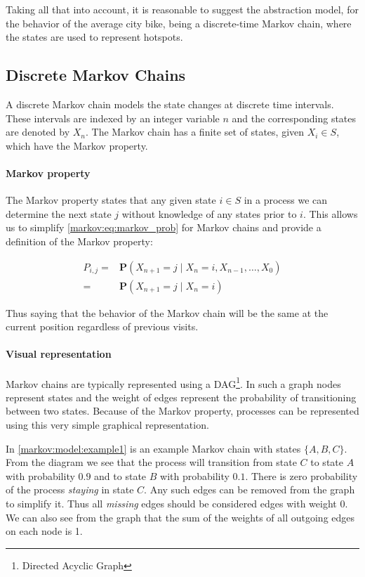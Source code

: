Taking all that into account, it is reasonable to suggest the abstraction model, for the behavior of the average city bike, being a discrete-time Markov chain, where the states are used to represent hotspots.

\subsection{Discrete Markov Chains}\label{markov}
A discrete Markov chain models the state changes at discrete time intervals.
These intervals are indexed by an integer variable $ n $ and the corresponding states are denoted by $ X_n $.
The Markov chain has a finite set of states, given $X_i \in S$, which have the Markov property.

\paragraph{Markov property}\label{markov:property}
The Markov property states that any given state $i \in S$ in a process we can determine the next state $j$ without knowledge of any states prior to $i$.
This allows us to simplify \cref{markov:eq:markov_prob} for Markov chains and provide a definition of the Markov property:

\begin{align}\label{markov:eq:markov_prob}
P_{i,j} = &\mathbf{P}(X_{n+1} = j \mid X_n = i, X_{n-1}, \dots, X_0) \nonumber\\
        = &\mathbf{P}(X_{n+1} = j \mid X_n = i)
\end{align}

Thus saying that the behavior of the Markov chain will be the same at the current position regardless of previous visits.


\paragraph{Visual representation}
Markov chains are typically represented using a DAG\footnote{Directed Acyclic Graph}.
In such a graph nodes represent states and the weight of edges represent the probability of transitioning between two states.
Because of the Markov property, processes can be represented using this very simple graphical representation.

In \cref{markov:model:example1} is an example Markov chain with states $\{A, B, C\}$.
From the diagram we see that the process will transition from state $C$ to state $A$ with probability $0.9$ and to state $B$ with probability $0.1$.
There is zero probability of the process \textit{staying} in state $C$.
Any such edges can be removed from the graph to simplify it.
Thus all \emph{missing} edges should be considered edges with weight 0.
We can also see from the graph that the sum of the weights of all outgoing edges on each node is 1.


